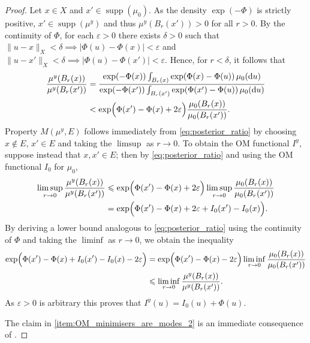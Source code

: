\documentclass[11pt]{article}
\newcommand*{\cball}[2]{B_{#2}(#1)}
\newcommand*{\rd}{\mathrm{d}}
\DeclareMathOperator*{\supp}{supp}
\renewcommand*{\leq}{\leqslant}
\theoremstyle{plain}
\theoremstyle{definition}
\newcommand{\absval}[1]{\lvert #1 \rvert}
\newcommand{\norm}[1]{\lVert #1 \rVert}
\numberwithin{equation}{section}
\numberwithin{figure}{section}
\numberwithin{table}{section}
\begin{document}
\begin{proof}
	Let $x \in X$ and $x' \in \supp(\mu_{0})$.
	As the density $\exp(-\Phi)$ is strictly positive, $x' \in \supp(\mu^{y})$ and thus $\mu^{y}(\cball{x'}{r}) > 0$ for all $r > 0$.
	By the continuity of $\Phi$, for each $\varepsilon > 0$ there exists $\delta > 0$ such that $\norm{u - x}_X < \delta \implies \absval{\Phi(u) - \Phi(x)} < \varepsilon$ and $\norm{u - x'}_X < \delta \implies \absval{\Phi(u) - \Phi(x')} < \varepsilon$.
	Hence, for $r < \delta$, it follows that
	\begin{align}
		\notag
		\frac{\mu^y(\cball{x}{r})}{\mu^y(\cball{x'}{r})} &= \frac{\exp(-\Phi(x)) \int_{\cball{x}{r}} \exp(\Phi(x) - \Phi(u)) \,\mu_0(\rd u)}{\exp(-\Phi(x')) \int_{\cball{x'}{r}} \exp(\Phi(x') - \Phi(u)) \,\mu_0(\rd u)} \\
		\label{eq:posterior_ratio}
		&< \exp\Bigl(\Phi(x') - \Phi(x) + 2\varepsilon\Bigr) \frac{\mu_0(\cball{x}{r})}{\mu_0(\cball{x'}{r})}.
	\end{align}
	Property $M(\mu^y, E)$ follows immediately from \eqref{eq:posterior_ratio} by choosing $x \notin E$, $x' \in E$ and taking the $\limsup$ as $r \to 0$.
	To obtain the OM functional $I^{y}$, suppose instead that $x, x' \in E$; then by \eqref{eq:posterior_ratio} and using the OM functional $I_{0}$ for $\mu_{0}$,
	\begin{align*}
		\limsup_{r \to 0} \frac{\mu^{y}(\cball{x}{r})}{\mu^{y}(\cball{x'}{r})}
		&\leq \exp\Bigl( \Phi(x') - \Phi(x) + 2\varepsilon \Bigr) \limsup_{r \to 0} \frac{\mu_{0}(\cball{x}{r})}{\mu_{0}(\cball{x'}{r})} \\
		&= \exp\Bigl(\Phi(x') - \Phi(x) + 2\varepsilon + I_{0}(x') - I_{0}(x) \Bigr).
	\end{align*}
	By deriving a lower bound analogous to \eqref{eq:posterior_ratio} using the continuity of $\Phi$ and taking the $\liminf$ as $r \to 0$, we obtain the inequality
	\begin{align*}
		\exp\Bigl(\Phi(x') - \Phi(x) + I_{0}(x') - I_{0}(x) - 2\varepsilon \Bigr) &= \exp\Bigl( \Phi(x') - \Phi(x) - 2\varepsilon \Bigr) \liminf_{r \to 0} \frac{\mu_{0}(\cball{x}{r})}{\mu_{0}(\cball{x'}{r})} \\
		&\leq \liminf_{r \to 0} \frac{\mu^{y}(\cball{x}{r})}{\mu^{y}(\cball{x'}{r})}.
	\end{align*}
	As $\varepsilon > 0$ is arbitrary this proves that $I^{y}(u) = I_{0}(u) + \Phi(u)$.
	
	The claim in \ref{item:OM_minimisers_are_modes_2} is an immediate consequence of \citet[Proposition~4.1]{AyanbayevKlebanovLieSullivan2022a}.
\end{proof}
\end{document}
